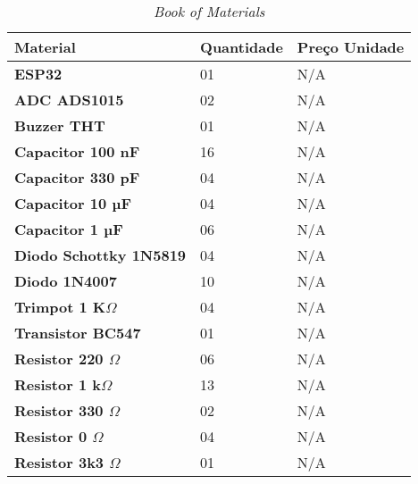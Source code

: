 \begin{table}[!ht]
    \centering
    \caption{\textit{Book of Materials}}
    \label{tab:specstable}
    \begin{tabular}{|l|l|l|}
        \hline
        \textbf{Material}                      & \textbf{Quantidade} & \textbf{Preço Unidade} \\ \hline
        \textbf{ESP32}                         & 01                  & N/A                    \\ \hline
        \textbf{ADC ADS1015}                   & 02                  & N/A                    \\ \hline
        \textbf{Buzzer THT}                    & 01                  & N/A                    \\ \hline
        \textbf{Capacitor 100 nF}              & 16                  & N/A                    \\ \hline
        \textbf{Capacitor 330 pF}              & 04                  & N/A                    \\ \hline
        \textbf{Capacitor 10 µF}               & 04                  & N/A                    \\ \hline
        \textbf{Capacitor 1 µF}                & 06                  & N/A                    \\ \hline
        \textbf{Diodo Schottky 1N5819}         & 04                  & N/A                    \\ \hline
        \textbf{Diodo 1N4007}                  & 10                  & N/A                    \\ \hline
        \textbf{Trimpot 1 K$\Omega$}           & 04                  & N/A                    \\ \hline
        \textbf{Transistor BC547}              & 01                  & N/A                    \\ \hline
        \textbf{Resistor 220 $\Omega$}         & 06                  & N/A                    \\ \hline
        \textbf{Resistor 1 k$\Omega$}          & 13                  & N/A                    \\ \hline
        \textbf{Resistor 330 $\Omega$}         & 02                  & N/A                    \\ \hline
        \textbf{Resistor 0 $\Omega$}           & 04                  & N/A                    \\ \hline
        \textbf{Resistor 3k3 $\Omega$}         & 01                  & N/A                    \\ \hline

\end{tabular}
\end{table}
